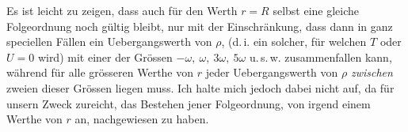 \expandafter\def\csname HistoricalNoteText14\endcsname{Es ist leicht zu zeigen, dass auch für den Werth $r=R$ selbst eine gleiche Folgeordnung noch
gültig bleibt, nur mit der Einschränkung, dass dann in ganz speciellen Fällen ein Uebergangswerth von $\rho$,
(d.\,i. ein solcher, für welchen $T$ oder $U=0$ wird) mit einer der Grössen $-\omega,\ \omega,\ 3\omega,\ 5\omega$ u.\,s.\,w. zusammenfallen kann, während für alle grösseren Werthe von $r$ jeder Uebergangswerth von $\rho$ \emph{zwischen} zweien dieser Grössen liegen muss. Ich halte mich jedoch dabei nicht auf, da für unsern Zweck zureicht, das Bestehen
jener Folgeordnung, von irgend einem Werthe von $r$ an, nachgewiesen zu haben.}
